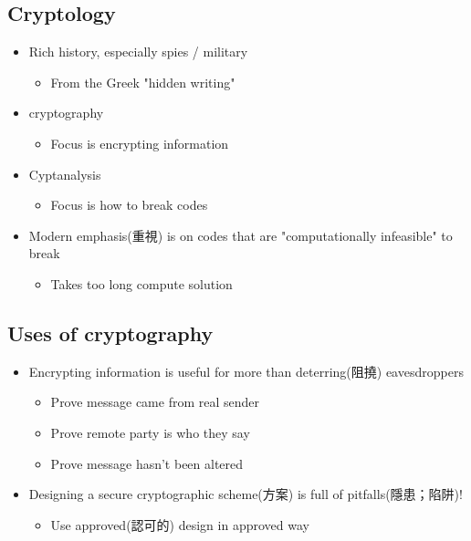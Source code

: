 \documentclass[12pt]{ctexart}   %
\begin{document}
	\subsection{Cryptology}
	\begin{itemize}
		\item Rich history, especially spies / military
		\begin{itemize}
			\item From the Greek "hidden writing"
		\end{itemize}

		\item cryptography
		\begin{itemize}
			\item Focus is encrypting information
		\end{itemize}

		\item  Cyptanalysis
		\begin{itemize}
			\item Focus is how to break codes
		\end{itemize}

		\item  Modern emphasis(重視) is on codes that are "computationally infeasible" to break
		\begin{itemize}
			\item Takes too long compute solution
		\end{itemize}
	\end{itemize}

	\subsection{Uses of cryptography}
	\begin{itemize}
		\item Encrypting information is useful for more than deterring(阻撓) eavesdroppers
		\begin{itemize}
			\item Prove message came from real sender
			\item Prove remote party is who they say
			\item Prove message hasn't been altered
		\end{itemize}

		\item  Designing a secure cryptographic scheme(方案) is full of pitfalls(隱患；陷阱)!
		\begin{itemize}
			\item Use approved(認可的) design in approved way
		\end{itemize}
	\end{itemize}
\end{document}
